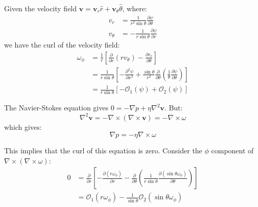\documentclass[12pt]{article}
\begin{document}
Given the velocity field $\mathbf{v} = \mathbf{v}_{r} \hat{r} + \mathbf{v}_{\theta} \hat{\theta}$, where:
\begin{equation}
    \begin{split}
        v_{r} &= \frac{1}{r^{2}\sin{\theta}} \frac{\partial \psi}{\partial \theta} \\
        v_{\theta} &= -\frac{1}{r\sin{\theta}} \frac{\partial \psi}{\partial r}
    \end{split}
\end{equation}
we have the curl of the velocity field:
\begin{equation}
    \begin{split}
        \omega_{\phi} &= \frac{1}{r} \left[ \frac{\partial}{\partial r} (r v_{\theta}) - \frac{\partial v_{r}}{\partial \theta} \right] \\
        &= \frac{1}{r\sin{\theta}} \left[ -\frac{\partial^{2} \psi}{\partial x^{2}} + \frac{\sin{\theta}}{r^{2}} \frac{\partial }{\partial \theta} \left( \frac{1}{\theta} \frac{\partial \psi}{\partial \theta} \right) \right] \\
        &= \frac{1}{r\sin{\theta}} \left[ -\mathcal{O} _{1}(\psi) + \mathcal{O} _{2}(\psi) \right]
    \end{split}
\end{equation}

The Navier-Stokes equation gives $0 = -\nabla p + \eta \nabla^{2} \mathbf{v}$. But:
\begin{equation}
    \nabla^{2} \mathbf{v} = -\nabla \times (\nabla \times \mathbf{v}) = -\nabla \times \omega
\end{equation}
which gives:
\begin{equation}
    \nabla p = -\eta \nabla \times \omega
\end{equation}

This implies that the curl of this equation is zero. Consider the $\phi$ component of $\nabla \times (\nabla \times \omega)$:
\begin{equation}
    \begin{split}
        0 &= \frac{\partial }{\partial r} \left[ -\frac{\partial (r\omega_{\phi})}{\partial r} - \frac{\partial }{\partial \theta} \left( \frac{1}{r\sin{\theta}} \frac{\partial (\sin{\theta} \omega_{\phi})}{\partial \theta} \right) \right] \\
        &= \mathcal{O}_{1}(r\omega_{\phi}) - \frac{1}{\sin{\theta}} \mathcal{O}_{2}(\sin{\theta}\omega_{\phi})
    \end{split}
\end{equation}
\end{document}
